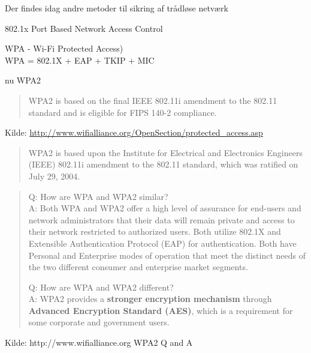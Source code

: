\documentclass[Screen16to9,17pt]{foils}
\begin{document}
\begin{list1}
\item Der findes idag andre metoder til sikring af trådløse netværk
\item 802.1x Port Based Network Access Control
\item WPA - Wi-Fi Protected Access)\\
WPA = 802.1X + EAP + TKIP + MIC
\item nu WPA2
\begin{quote}
WPA2 is based on the final IEEE 802.11i amendment to the 802.11
standard and is eligible for FIPS 140-2 compliance.
\end{quote}
\item Kilde:
\href{http://www.wifialliance.org/OpenSection/protected_access.asp}
{http://www.wifialliance.org/OpenSection/protected\_access.asp}
\end{list1}


\begin{quote}
WPA2 is based upon the Institute for Electrical and Electronics
Engineers (IEEE) 802.11i amendment to the 802.11 standard, which was
ratified on July 29, 2004.
\end{quote}

\begin{quote}
Q: How are WPA and WPA2 similar?\\
A: Both WPA and WPA2 offer a high level of assurance for end-users and network
administrators that their data will remain private and access to their
network restricted to authorized users.
Both utilize 802.1X and Extensible Authentication Protocol (EAP) for
authentication. Both have Personal and Enterprise modes of operation
that meet the distinct needs of the two different consumer and
enterprise market segments.

Q: How are WPA and WPA2 different?\\
A: WPA2 provides a {\bf stronger encryption mechanism} through {\bf
  Advanced Encryption Standard (AES)}, which is a requirement for some
corporate and government users.
\end{quote}

\centerline{Kilde: http://www.wifialliance.org WPA2 Q and A}

\end{document}
